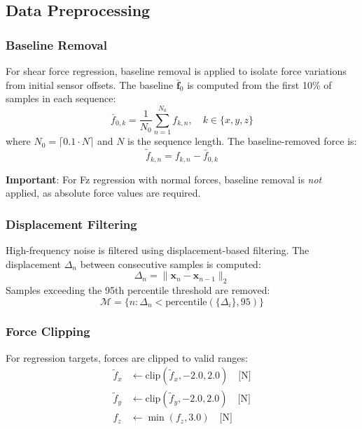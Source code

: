 \documentclass[11pt,a4paper]{article}
\begin{document}
\subsection{Data Preprocessing}

\subsubsection{Baseline Removal}

For shear force regression, baseline removal is applied to isolate force variations from initial sensor offsets. The baseline $\bar{\mathbf{f}}_0$ is computed from the first 10\% of samples in each sequence:
\begin{equation}
\bar{f}_{0,k} = \frac{1}{N_0} \sum_{n=1}^{N_0} f_{k,n}, \quad k \in \{x, y, z\}
\end{equation}
where $N_0 = \lceil 0.1 \cdot N \rceil$ and $N$ is the sequence length. The baseline-removed force is:
\begin{equation}
\tilde{f}_{k,n} = f_{k,n} - \bar{f}_{0,k}
\end{equation}

\textbf{Important}: For Fz regression with normal forces, baseline removal is \textit{not} applied, as absolute force values are required.

\subsubsection{Displacement Filtering}

High-frequency noise is filtered using displacement-based filtering. The displacement $\Delta_n$ between consecutive samples is computed:
\begin{equation}
\Delta_n = \|\mathbf{x}_n - \mathbf{x}_{n-1}\|_2
\end{equation}
Samples exceeding the 95th percentile threshold are removed:
\begin{equation}
\mathcal{M} = \{n : \Delta_n < \text{percentile}(\{\Delta_i\}, 95)\}
\end{equation}

\subsubsection{Force Clipping}

For regression targets, forces are clipped to valid ranges:
\begin{align}
\tilde{f}_x &\leftarrow \text{clip}(\tilde{f}_x, -2.0, 2.0) \quad \text{[N]} \\
\tilde{f}_y &\leftarrow \text{clip}(\tilde{f}_y, -2.0, 2.0) \quad \text{[N]} \\
f_z &\leftarrow \min(f_z, 3.0) \quad \text{[N]}
\end{align}
\end{document}

